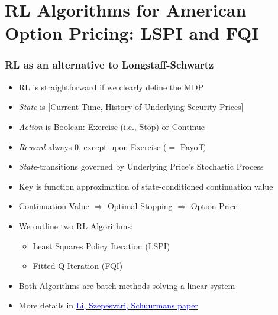 \documentclass[handout]{beamer}
\begin{document}
\section{RL Algorithms for American Option Pricing: LSPI and FQI}

\begin{frame}
\frametitle{RL as an alternative to Longstaff-Schwartz}
\pause
\begin{itemize}[<+->]
\item RL is straightforward if we clearly define the MDP
\item {\em State} is [Current Time, History of Underlying Security Prices]
\item {\em Action} is Boolean: Exercise (i.e., Stop) or Continue
\item {\em Reward} always 0, except upon Exercise ($=$ Payoff)
\item {\em State}-transitions governed by Underlying Price's Stochastic Process
\item Key is function approximation of state-conditioned continuation value
\item Continuation Value $\Rightarrow$ Optimal Stopping $\Rightarrow$ Option Price
\item We outline two RL Algorithms:
\begin{itemize}
\item Least Squares Policy Iteration (LSPI)
\item Fitted Q-Iteration (FQI)
\end{itemize}
\item Both Algorithms are batch methods solving a linear system
\item More details in \href{http://proceedings.mlr.press/v5/li09d/li09d.pdf}{\underline{\textcolor{blue}{Li, Szepesvari, Schuurmans paper}}}
\end{itemize}
\end{frame}
\end{document}
